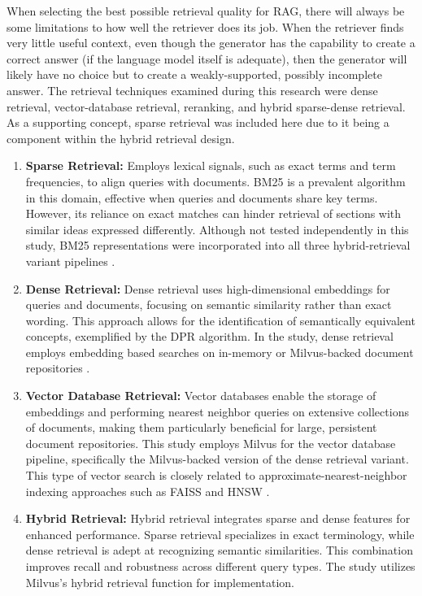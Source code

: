 When selecting the best possible retrieval quality for \ac{RAG}, there will always be some limitations to how well the retriever does its job. When the retriever finds very little useful context, even though the generator has the capability to create a correct answer (if the language model itself is adequate), then the generator will likely have no choice but to create a weakly-supported, possibly incomplete answer. The retrieval techniques examined during this research were dense retrieval, vector-database retrieval, reranking, and hybrid sparse-dense retrieval. As a supporting concept, sparse retrieval was included here due to it being a component within the hybrid retrieval design.

\begin{enumerate}
    \item \textbf{Sparse Retrieval:} Employs lexical signals, such as exact terms and term frequencies, to align queries with documents. \ac{BM25} is a prevalent algorithm in this domain, effective when queries and documents share key terms. However, its reliance on exact matches can hinder retrieval of sections with similar ideas expressed differently. Although not tested independently in this study, \ac{BM25} representations were incorporated into all three hybrid-retrieval variant pipelines \cite{robertson2009bm25}.
    
    \item \textbf{Dense Retrieval:} Dense retrieval uses high-dimensional embeddings for queries and documents, focusing on semantic similarity rather than exact wording. This approach allows for the identification of semantically equivalent concepts, exemplified by the \ac{DPR} algorithm. In the study, dense retrieval employs embedding based searches on in-memory or Milvus-backed document repositories \cite{karpukhin2020dpr}.
    
    \item \textbf{Vector Database Retrieval:} Vector databases enable the storage of embeddings and performing nearest neighbor queries on extensive collections of documents, making them particularly beneficial for large, persistent document repositories. This study employs Milvus for the vector database pipeline, specifically the Milvus-backed version of the dense retrieval variant. This type of vector search is closely related to approximate-nearest-neighbor indexing approaches such as \ac{FAISS} and \ac{HNSW} \cite{johnson2017faiss,malkov2018hnsw}.
    
    \item \textbf{Hybrid Retrieval:} Hybrid retrieval integrates sparse and dense features for enhanced performance. Sparse retrieval specializes in exact terminology, while dense retrieval is adept at recognizing semantic similarities. This combination improves recall and robustness across different query types. The study utilizes Milvus's hybrid retrieval function for implementation.
    

\end{enumerate}
